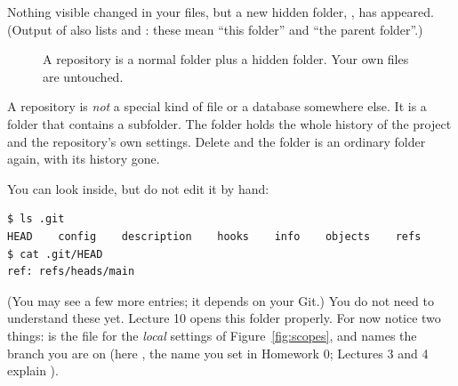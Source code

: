 Nothing visible changed in your files, but a new hidden folder, , has appeared. (Output of \mbox{} also lists  and : these mean ``this folder'' and ``the parent folder''.)

\begin{figure}[H]
\centering
{}
\caption{A repository is a normal folder plus a hidden  folder. Your own files are untouched.}
\label{fig:init}
\end{figure}

\begin{keyidea}
A repository is \emph{not} a special kind of file or a database somewhere else. It is a folder that contains a  subfolder. The  folder holds the whole history of the project and the repository's own settings. Delete  and the folder is an ordinary folder again, with its history gone.
\end{keyidea}

You can look inside, but do not edit it by hand:

\begin{lstlisting}
$ ls .git
HEAD    config    description    hooks    info    objects    refs
$ cat .git/HEAD
ref: refs/heads/main
\end{lstlisting}
(You may see a few more entries; it depends on your Git.) You do not need to understand these yet. Lecture 10 opens this folder properly. For now notice two things:  is the file for the \emph{local} settings of Figure~\ref{fig:scopes}, and  names the branch you are on (here , the name you set in Homework 0; Lectures 3 and 4 explain ).

